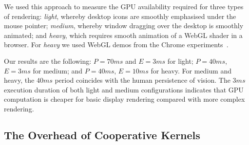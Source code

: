 \documentclass[sigconf]{acmart}
\newcommand{\mytablong}{Table~}
\newcommand{\mysec}{Sec.~}
\begin{document}
{We used this approach to measure the GPU availability required for three
types of rendering: \emph{light}, whereby desktop icons are smoothly
emphasised under the mouse pointer; \emph{medium}, whereby window
dragging over the desktop is smoothly animated; and \emph{heavy}, which
requires smooth animation of a WebGL shader in a browser.  For
\emph{heavy} we used WebGL demos from the Chrome
experiments~\cite{chrome-experiments}.%



Our results are the following: $P=70\mathit{ms}$ and $E=3\mathit{ms}$ for light;
$P=40\mathit{ms}$, $E=3\mathit{ms}$ for medium; and $P=40\mathit{ms}$, $E=10\mathit{ms}$ for heavy. For
medium and heavy, the $40\mathit{ms}$ period coincides with the human persistence
of vision. The $3\mathit{ms}$ execution duration of both light and medium
configurations indicates that GPU computation is cheaper for basic
display rendering compared with more complex rendering.%




\subsection{The Overhead of Cooperative Kernels}\label{sec:overhead}

}
\end{document}
